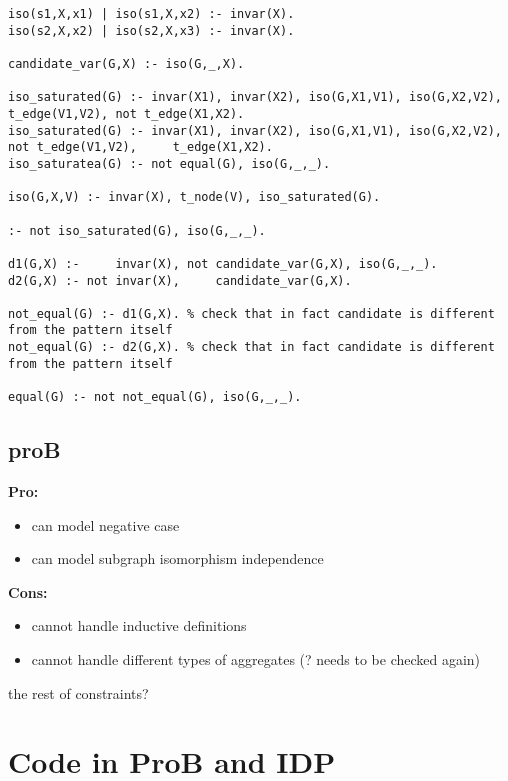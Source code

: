 \documentclass{article}
\theoremstyle{definition}
\begin{document}
\begin{lstlisting}[caption=Canonicity previous solution isomorphism check, style=model]
iso(s1,X,x1) | iso(s1,X,x2) :- invar(X).
iso(s2,X,x2) | iso(s2,X,x3) :- invar(X).

candidate_var(G,X) :- iso(G,_,X).

iso_saturated(G) :- invar(X1), invar(X2), iso(G,X1,V1), iso(G,X2,V2),     t_edge(V1,V2), not t_edge(X1,X2). 
iso_saturated(G) :- invar(X1), invar(X2), iso(G,X1,V1), iso(G,X2,V2), not t_edge(V1,V2),     t_edge(X1,X2). 
iso_saturatea(G) :- not equal(G), iso(G,_,_). 

iso(G,X,V) :- invar(X), t_node(V), iso_saturated(G).

:- not iso_saturated(G), iso(G,_,_).

d1(G,X) :-     invar(X), not candidate_var(G,X), iso(G,_,_).
d2(G,X) :- not invar(X),     candidate_var(G,X).

not_equal(G) :- d1(G,X). % check that in fact candidate is different from the pattern itself
not_equal(G) :- d2(G,X). % check that in fact candidate is different from the pattern itself

equal(G) :- not not_equal(G), iso(G,_,_).
\end{lstlisting}


\subsection{proB}
\textbf{Pro:}
\begin{itemize}
  \item can model negative case
  \item can model subgraph isomorphism independence
\end{itemize}
\textbf{Cons:}
\begin{itemize}
  \item cannot handle inductive definitions
  \item cannot handle different types of aggregates (? needs to be checked again)
\end{itemize}

the rest of constraints? 

\section{Code in ProB and IDP}

\pagebreak




\end{document}
